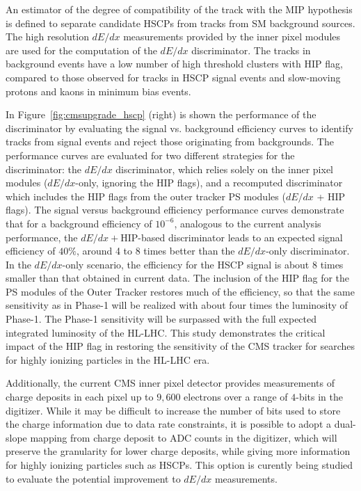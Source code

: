 An estimator of the degree of compatibility of the track with the MIP hypothesis is defined to separate candidate HSCPs from tracks from SM background sources. The high resolution $dE/dx$ measurements provided by the inner pixel modules are used for the computation of the $dE/dx$ discriminator. The tracks in background events have a low number of high threshold clusters with HIP flag, compared to those observed for tracks in HSCP signal events and slow-moving protons and kaons in minimum bias events.

In Figure~\ref{fig:cmsupgrade_hscp} (right) is shown the performance of the discriminator by evaluating the signal vs. background efficiency curves to identify tracks from signal events and reject those originating from backgrounds. The performance curves are evaluated for two different strategies for the discriminator: the $dE/dx$ discriminator, which relies solely on the inner pixel modules ($dE/dx$-only, ignoring the HIP flags), and a recomputed discriminator which includes the HIP flags from the outer tracker PS modules ($dE/dx$ + HIP flags). The signal versus background efficiency performance curves demonstrate that for a background efficiency of $10^{-6}$, analogous to the current analysis performance, the $dE/dx+$HIP-based discriminator leads to an expected signal efficiency of $40\%$, around 4 to 8 times better than the $dE/dx$-only discriminator. In the $dE/dx$-only scenario, the efficiency for the HSCP signal is about 8 times smaller than that obtained in current data. The inclusion of the HIP flag for the PS modules of the Outer Tracker restores much of the efficiency, so that the same sensitivity as in Phase-1 will be realized with about four times the luminosity of Phase-1. The Phase-1 sensitivity will be surpassed with the full expected integrated luminosity of the HL-LHC. This study demonstrates the critical impact of the HIP flag in restoring the sensitivity of the CMS tracker for searches for highly ionizing particles in the HL-LHC era.

Additionally, the current CMS inner pixel detector provides measurements of charge deposits in each pixel up to $9,600$ electrons over a range of $4$-bits in the digitizer. While it may be difficult to increase the number of bits used to store the charge information due to data rate constraints, it is possible to adopt a dual-slope mapping from charge deposit to ADC counts in the digitizer, which will preserve the granularity for lower charge deposits, while giving more information for highly ionizing particles such as HSCPs. This option is curently being studied to evaluate the potential improvement to $dE/dx$ measurements. 

